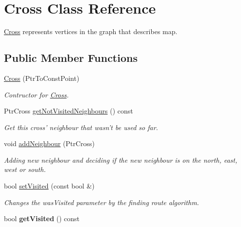 \hypertarget{classCross}{\section{Cross Class Reference}
\label{classCross}
}


\hyperlink{classCross}{Cross} represents vertices in the graph that describes map.  


\subsection*{Public Member Functions}
\begin{DoxyCompactItemize}
\item 
\hypertarget{classCross_a286bbd27e501b06c9989761815e4d150}{\hyperlink{classCross_a286bbd27e501b06c9989761815e4d150}{Cross} (Ptr\-To\-Const\-Point)}\label{classCross_a286bbd27e501b06c9989761815e4d150}

\begin{DoxyCompactList}\small\item\em Contructor for \hyperlink{classCross}{Cross}. \end{DoxyCompactList}\item 
Ptr\-Cross \hyperlink{classCross_a1e34c8d8207885c31fccc057e459eca0}{get\-Not\-Visited\-Neighbours} () const 
\begin{DoxyCompactList}\small\item\em Get this cross' neighbour that wasn't be used so far. \end{DoxyCompactList}\item 
void \hyperlink{classCross_a9a0803c662e8a9ebbeb25d2fb30b60d3}{add\-Neighbour} (Ptr\-Cross)
\begin{DoxyCompactList}\small\item\em Adding new neighbour and deciding if the new neighbour is on the north, east, west or south. \end{DoxyCompactList}\item 
bool \hyperlink{classCross_a707bf409f962936051ca4a35b086a1f6}{set\-Visited} (const bool \&)
\begin{DoxyCompactList}\small\item\em Changes the was\-Visited parameter by the finding route algorithm. \end{DoxyCompactList}\item 
\hypertarget{classCross_af04ae2fbefce9e2313e5cf172268635f}{bool {\bfseries get\-Visited} () const }\label{classCross_af04ae2fbefce9e2313e5cf172268635f}


\end{DoxyCompactItemize}
